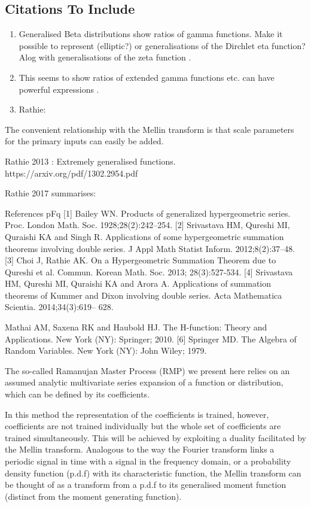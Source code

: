 \documentclass[journal=jcisd8,manuscript=article,layout=onecolumn,pdftex,floatfix,amsmath,amssymb,10pt]{achemso}
\begin{document}
\subsection{Citations To Include}
\begin{enumerate}
\item Generalised Beta distributions show ratios of gamma functions. Make it possible to represent (elliptic?) or generalisations of the Dirchlet eta function? Alog with generalisations of the zeta function \citep{ostrovsky2013theory}.
\item This seems to show ratios of extended gamma functions etc. can have powerful expressions \citep{Luo2013}.
\item Rathie: %
\end{enumerate}
The convenient relationship with the Mellin transform is that scale parameters for the primary inputs can easily be added.


\citep{Rathie2013}
Rathie 2013 : Extremely generalised functions.
https://arxiv.org/pdf/1302.2954.pdf


Rathie 2017 summarises:

References pFq
[1] Bailey WN. Products of generalized hypergeometric series. Proc. London Math. Soc.
1928;28(2):242–254.
[2] Srivastava HM, Qureshi MI, Quraishi KA and Singh R. Applications of some hypergeometric
summation theorems involving double series. J Appl Math Statist Inform. 2012;8(2):37–48.
[3] Choi J, Rathie AK. On a Hypergeometric Summation Theorem due to Qureshi et al. Commun.
Korean Math. Soc. 2013; 28(3):527-534.
[4] Srivastava HM, Qureshi MI, Quraishi KA and Arora A. Applications of summation theorems
of Kummer and Dixon involving double series. Acta Mathematica Scientia. 2014;34(3):619–
628.


Mathai AM, Saxena RK and Haubold HJ. The H-function: Theory and Applications. New
York (NY): Springer; 2010.
[6] Springer MD. The Algebra of Random Variables. New York (NY): John Wiley; 1979.



The so-called Ramanujan Master Process (RMP) we present here relies on an assumed analytic multivariate series expansion of a function or distribution, which can be defined by its coefficients. 

In this method the representation of the coefficients is trained, however, coefficients are not trained individually but the whole set of coefficients are trained simultaneously. This will be achieved by exploiting a duality facilitated by the Mellin transform. Analogous to the way the Fourier transform links a periodic signal in time with a signal in the frequency domain, or a probability density function (p.d.f) with its characteristic function, the Mellin transform can be thought of as a transform from a p.d.f to its generalised moment function (distinct from the moment generating function). \par
\end{document}
